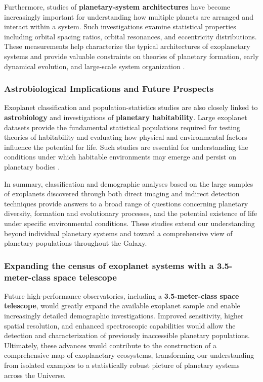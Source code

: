 Furthermore, studies of \textbf{planetary-system architectures} have become increasingly important for understanding how multiple planets are arranged and interact within a system. Such investigations examine statistical properties including orbital spacing ratios, orbital resonances, and eccentricity distributions. These measurements help characterize the typical architectures of exoplanetary systems and provide valuable constraints on theories of planetary formation, early dynamical evolution, and large-scale system organization \cite{howe2025}.

\subsubsection{Astrobiological Implications and Future Prospects}

Exoplanet classification and population-statistics studies are also closely linked to \textbf{astrobiology} and investigations of \textbf{planetary habitability}. Large exoplanet datasets provide the fundamental statistical populations required for testing theories of habitability and evaluating how physical and environmental factors influence the potential for life. Such studies are essential for understanding the conditions under which habitable environments may emerge and persist on planetary bodies \cite{hong2023}.

In summary, classification and demographic analyses based on the large samples of exoplanets discovered through both direct imaging and indirect detection techniques provide answers to a broad range of questions concerning planetary diversity, formation and evolutionary processes, and the potential existence of life under specific environmental conditions. These studies extend our understanding beyond individual planetary systems and toward a comprehensive view of planetary populations throughout the Galaxy.

\subsubsection{Expanding the census of exoplanet systems with a 3.5-meter-class space telescope}

Future high-performance observatories, including a \textbf{3.5-meter-class space telescope}, would greatly expand the available exoplanet sample and enable increasingly detailed demographic investigations. Improved sensitivity, higher spatial resolution, and enhanced spectroscopic capabilities would allow the detection and characterization of previously inaccessible planetary populations. Ultimately, these advances would contribute to the construction of a comprehensive map of exoplanetary ecosystems, transforming our understanding from isolated examples to a statistically robust picture of planetary systems across the Universe.


